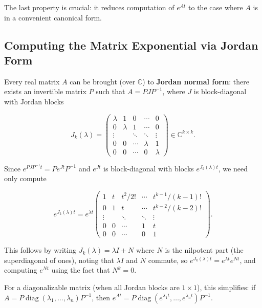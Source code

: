 The last property is crucial: it reduces computation of $e^{At}$ to the case where $A$ is in a convenient canonical form.

\subsection{Computing the Matrix Exponential via Jordan Form}\label{sec:3.3.2}

Every real matrix $A$ can be brought (over $\mathbb{C}$) to \textbf{Jordan normal form}: there exists an invertible matrix $P$ such that $A = PJP^{-1}$, where $J$ is block-diagonal with Jordan blocks

\[
J_k(\lambda) = \begin{pmatrix} \lambda & 1 & 0 & \cdots & 0 \\ 0 & \lambda & 1 & \cdots & 0 \\ \vdots & & \ddots & \ddots & \vdots \\ 0 & 0 & \cdots & \lambda & 1 \\ 0 & 0 & \cdots & 0 & \lambda \end{pmatrix} \in \mathbb{C}^{k \times k}.
\]

Since $e^{PJP^{-1}t} = P e^{Jt} P^{-1}$ and $e^{Jt}$ is block-diagonal with blocks $e^{J_k(\lambda)t}$, we need only compute

\begin{equation}\label{eq:3.4}\tag{3.4}
e^{J_k(\lambda)t} = e^{\lambda t} \begin{pmatrix} 1 & t & t^2/2! & \cdots & t^{k-1}/(k-1)! \\ 0 & 1 & t & \cdots & t^{k-2}/(k-2)! \\ \vdots & & \ddots & \ddots & \vdots \\ 0 & 0 & \cdots & 1 & t \\ 0 & 0 & \cdots & 0 & 1 \end{pmatrix}.
\end{equation}

This follows by writing $J_k(\lambda) = \lambda I + N$ where $N$ is the nilpotent part (the superdiagonal of ones), noting that $\lambda I$ and $N$ commute, so $e^{J_k(\lambda)t} = e^{\lambda t} e^{Nt}$, and computing $e^{Nt}$ using the fact that $N^k = 0$.

For a diagonalizable matrix (when all Jordan blocks are $1 \times 1$), this simplifies: if $A = P \operatorname{diag}(\lambda_1, \ldots, \lambda_n) P^{-1}$, then $e^{At} = P \operatorname{diag}(e^{\lambda_1 t}, \ldots, e^{\lambda_n t}) P^{-1}$.


